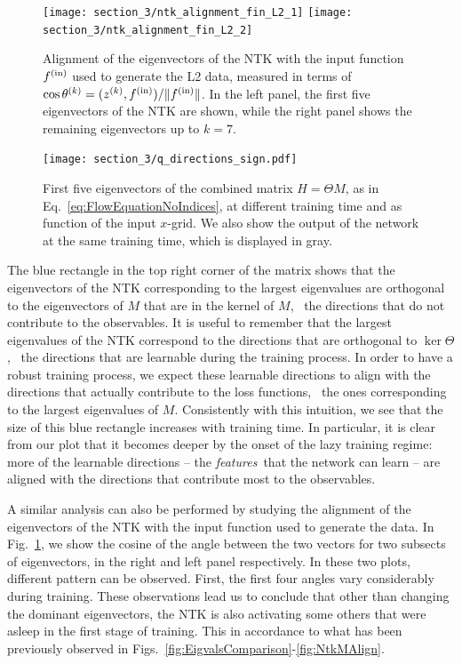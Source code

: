 \begin{figure}[ht!]
  \centering
  \texttt{[image: section\_3/ntk\_alignment\_fin\_L2\_1]}
  \texttt{[image: section\_3/ntk\_alignment\_fin\_L2\_2]}
  \caption{Alignment of the eigenvectors of the NTK with the input function
  $f^{\rm(in)}$ used to generate the L2 data, measured in terms of $\cos
  \theta^{(k)} = (z^{(k)}, f^{\rm{(in)}})/ \Vert f^{\rm{(in)}}\Vert$. In the
  left panel, the first five eigenvectors of the NTK are shown, while the right
  panel shows the remaining eigenvectors up to $k=7$.}
  \label{fig:NTKAlignFin}
\end{figure}
\begin{figure}[ht!]
  \centering
  \texttt{[image: section\_3/q\_directions\_sign.pdf]}
  \caption{First five eigenvectors of the combined matrix $H=\Theta M$, as in
  Eq.~\eqref{eq:FlowEquationNoIndices}, at different training time and as
  function of the input $x$-grid. We also show the output of the network at the
  same training time, which is displayed in gray.}
  \label{fig:NTKMEigVecs}
\end{figure}

The blue rectangle in the top right corner of the matrix shows that the
eigenvectors of the NTK corresponding to the largest eigenvalues are orthogonal
to the eigenvectors of $M$ that are in the kernel of $M$, \ie\ the directions
that do not contribute to the observables. It is useful to remember that the
largest eigenvalues of the NTK correspond to the directions that are orthogonal
to $\ker\Theta$, \ie\ the directions that are learnable during the training
process. In order to have a robust training process, we expect these learnable
directions to align with the directions that actually contribute to the loss
functions, \ie\ the ones corresponding to the largest eigenvalues of $M$.
Consistently with this intuition, we see that the size of this blue rectangle
increases with training time. In particular, it is clear from our plot that it
becomes deeper by the onset of the lazy training regime: more of the learnable
directions -- the {\it features}\ that the network can learn -- are aligned with
the directions that contribute most to the observables.

A similar analysis can also be performed by studying the alignment of the
eigenvectors of the NTK with the input function used to generate the data. In
Fig.~\ref{fig:NTKAlignFin}, we show the cosine of the angle between the two
vectors for two subsects of eigenvectors, in the right and left panel
respectively. In these two plots, different pattern can be observed. First, the
first four angles vary considerably during training. These observations lead us
to conclude that other than changing the dominant eigenvectors, the NTK is also
activating some others that were asleep in the first stage of training. This in
accordance to what has been previously observed in
Figs.~\ref{fig:EigvalsComparison}-\ref{fig:NtkMAlign}. 

